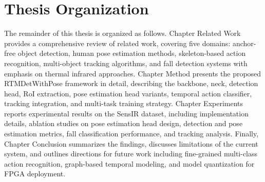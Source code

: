 \section{Thesis Organization}
\label{sec:intro_organization}

The remainder of this thesis is organized as follows. Chapter Related Work provides a comprehensive review of related work, covering five domains: anchor-free object detection, human pose estimation methods, skeleton-based action recognition, multi-object tracking algorithms, and fall detection systems with emphasis on thermal infrared approaches. Chapter Method presents the proposed RTMDetWithPose framework in detail, describing the backbone, neck, detection head, RoI extraction, pose estimation head variants, temporal action classifier, tracking integration, and multi-task training strategy. Chapter Experiments reports experimental results on the SensIR dataset, including implementation details, ablation studies on pose estimation head design, detection and pose estimation metrics, fall classification performance, and tracking analysis. Finally, Chapter Conclusion summarizes the findings, discusses limitations of the current system, and outlines directions for future work including fine-grained multi-class action recognition, graph-based temporal modeling, and model quantization for FPGA deployment.